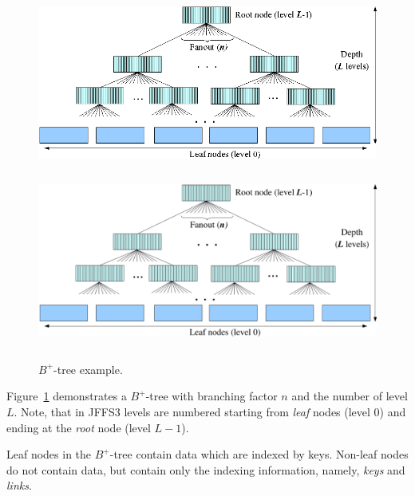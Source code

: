 %
%
\begin{figure}[h]
\begin{center}
\begin{htmlonly}
\includegraphics{pics/btree-01.png}
\end{htmlonly}
\includegraphics[width=159mm,height=65mm]{pics/btree-01.pdf}
\end{center}
\caption{$B^+$-tree example.}
\label{ref_FigureBTree_01}
\end{figure}

Figure~\ref{ref_FigureBTree_01} demonstrates a \mbox{$B^+$-tree} with branching
factor $n$ and the number of level $L$. Note, that in JFFS3 levels are numbered
starting from \emph{leaf} nodes (level 0) and ending at the \emph{root} node
(level $L-1$).

Leaf nodes in the \mbox{$B^+$-tree} contain data which are indexed by
keys. \mbox{Non-leaf} nodes do not contain data, but contain only the indexing
information, namely, \emph{keys} and \emph{links}.

